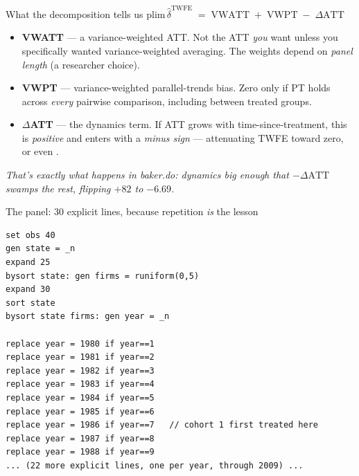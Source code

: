 \documentclass[aspectratio=169,11pt]{beamer}
\begin{document}
\begin{frame}{What the decomposition tells us}
\vspace{0.5em}
$\text{plim}\, \widehat{\delta}^{\text{TWFE}} \;=\; \text{VWATT} \;+\; \text{VWPT} \;-\; \Delta\text{ATT}$

\vspace{0.7em}
\begin{itemize}
  \item \textbf{VWATT} --- a variance-weighted ATT. \;Not the ATT \textit{you} want unless you specifically wanted variance-weighted averaging. \;The weights depend on \textit{panel length} (a researcher choice).
  \vspace{0.2em}
  \item \textbf{VWPT} --- variance-weighted parallel-trends bias. \;Zero only if PT holds across \textit{every} pairwise comparison, including between treated groups.
  \vspace{0.2em}
  \item \textbf{$\Delta$ATT} --- the dynamics term. \;If ATT grows with time-since-treatment, this is \textit{positive} and enters with a \textit{minus sign} --- attenuating TWFE toward zero, or even .
\end{itemize}

\vspace{0.6em}
\begin{center}
\small\color{warmgray}\itshape
That's exactly what happens in baker.do: dynamics big enough that $-\Delta\text{ATT}$ swamps the rest, flipping $+82$ to $-6.69$.
\end{center}
\end{frame}


\begin{frame}[fragile]{The panel: 30 explicit lines, because repetition \textit{is} the lesson}
\begin{lstlisting}[basicstyle=\ttfamily\tiny]
set obs 40
gen state = _n
expand 25
bysort state: gen firms = runiform(0,5)
expand 30
sort state
bysort state firms: gen year = _n

replace year = 1980 if year==1
replace year = 1981 if year==2
replace year = 1982 if year==3
replace year = 1983 if year==4
replace year = 1984 if year==5
replace year = 1985 if year==6
replace year = 1986 if year==7   // cohort 1 first treated here
replace year = 1987 if year==8
replace year = 1988 if year==9
... (22 more explicit lines, one per year, through 2009) ...
\end{lstlisting}
\end{frame}
\end{document}
